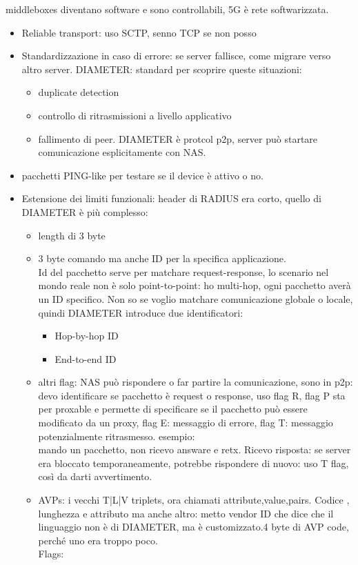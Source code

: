 \documentclass[16px]{article}
\begin{document}
middleboxes diventano software e sono controllabili, 5G è rete softwarizzata.\\
\begin{itemize}
\item Reliable transport: uso SCTP, senno TCP se non posso
\item Standardizzazione in caso di errore: se server fallisce, come migrare verso altro server. DIAMETER: standard per scoprire queste situazioni:
\begin{itemize}
\item duplicate detection
\item controllo di ritrasmissioni a livello applicativo
\item fallimento di peer. DIAMETER è protcol p2p, server può startare comunicazione esplicitamente con NAS.
\end{itemize}
\item pacchetti PING-like per testare se il device è attivo o no.
\item Estensione dei limiti funzionali: header di RADIUS era corto, quello di DIAMETER è più complesso:  
\begin{itemize}
\item length di 3 byte
\item 3 byte comando ma anche ID per la specifica applicazione.\\ Id del pacchetto serve per matchare request-response, lo scenario nel mondo reale non è solo point-to-point: ho multi-hop, ogni pacchetto averà un ID specifico. Non so se voglio matchare comunicazione globale o locale, quindi DIAMETER introduce due identificatori:
\begin{itemize}
\item Hop-by-hop ID
\item End-to-end ID
\end{itemize}
\item altri flag: NAS può rispondere o far partire la comunicazione, sono in p2p: devo identificare se pacchetto è request o response, uso flag R, flag P sta per proxable e permette di specificare se il pacchetto può essere modificato da un proxy, flag E: messaggio di errore, flag T: messaggio potenzialmente ritrasmesso. esempio: \\ mando un pacchetto, non ricevo answare e retx. Ricevo risposta: se server era bloccato temporaneamente, potrebbe rispondere di nuovo: uso T flag, così da darti avvertimento.
\item AVPs: i vecchi T|L|V triplets, ora chiamati attribute,value,pairs. Codice , lunghezza e attributo ma anche altro: metto vendor ID che dice che il linguaggio non è di DIAMETER, ma è customizzato.4 byte di AVP code, perché uno era troppo poco.\\ Flags:

\end{itemize}
\end{itemize}
\end{document}
